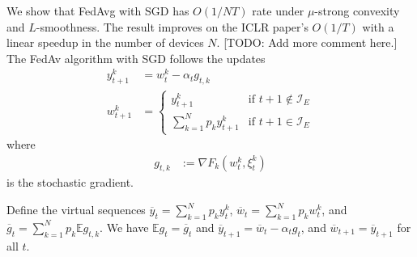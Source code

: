 We show that FedAvg with SGD has $O(1/NT)$ rate under $\mu$-strong
convexity and $L$-smoothness. The result improves on the ICLR paper's
$O(1/T)$ with a linear speedup in the number of devices $N$. {[}TODO:
Add more comment here.{]} The FedAv algorithm with SGD follows the
updates
\begin{align*}
y_{t+1}^{k} & =w_{t}^{k}-\alpha_{t}g_{t,k}\\
w_{t+1}^{k} & =\begin{cases}
y_{t+1}^{k} & \text{if }t+1\notin\mathcal{I}_{E}\\
\sum_{k=1}^{N}p_{k}y_{t+1}^{k} & \text{if }t+1\in\mathcal{I}_{E}
\end{cases}
\end{align*}
 where 
\begin{align*}
g_{t,k} & :=\nabla F_{k}(w_{t}^{k},\xi_{t}^{k})
\end{align*}
 is the stochastic gradient. 

Define the virtual sequences $\overline{y}_{t}=\sum_{k=1}^{N}p_{k}y_{t}^{k}$,
$\overline{w}_{t}=\sum_{k=1}^{N}p_{k}w_{t}^{k}$, and $\overline{g}_{t}=\sum_{k=1}^{N}p_{k}\mathbb{E}g_{t,k}$.
We have $\mathbb{E}g_{t}=\overline{g}_{t}$ and $\overline{y}_{t+1}=\overline{w}_{t}-\alpha_{t}g_{t}$,
and $\overline{w}_{t+1}=\overline{y}_{t+1}$ for all $t$. 

